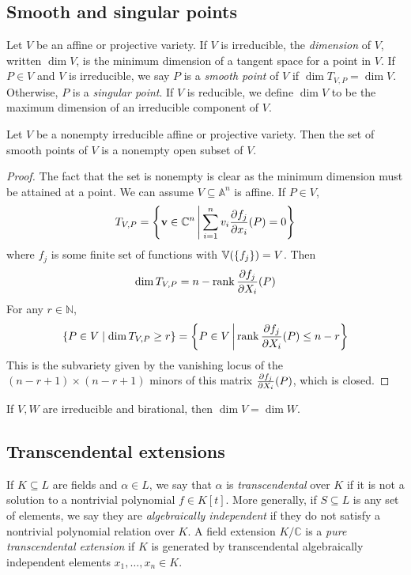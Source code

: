 \subsection{Smooth and singular points}
\begin{definition}
    Let \( V \) be an affine or projective variety.
    If \( V \) is irreducible, the \emph{dimension} of \( V \), written \( \dim V \), is the minimum dimension of a tangent space for a point in \( V \).
    If \( P \in V \) and \( V \) is irreducible, we say \( P \) is a \emph{smooth point} of \( V \) if \( \dim T_{V,P} = \dim V \).
    Otherwise, \( P \) is a \emph{singular point}.
    If \( V \) is reducible, we define \( \dim V \) to be the maximum dimension of an irreducible component of \( V \).
\end{definition}
\begin{theorem}
    Let \( V \) be a nonempty irreducible affine or projective variety.
    Then the set of smooth points of \( V \) is a nonempty open subset of \( V \).
\end{theorem}
\begin{proof}
    The fact that the set is nonempty is clear as the minimum dimension must be attained at a point.
    We can assume \( V \subseteq \mathbb A^n \) is affine.
    If \( P \in V \),
    \[ T_{V,P} = \qty{\vb v \in \mathbb C^n \,\middle|\,\sum_{i=1}^n v_i \pdv{f_j}{x_i}\qty(P) = 0} \]
    where \( f_j \) is some finite set of functions with \( \mathbb V(\qty{f_j}) = V \).
    Then
    \[ \dim T_{V,P} = n - \rank \pdv{f_j}{X_i}\qty(P) \]
    For any \( r \in \mathbb N \),
    \[ \qty{P \in V \mid \dim T_{V,P} \geq r} = \qty{P \in V \,\middle|\,\rank \pdv{f_j}{X_i}\qty(P) \leq n - r} \]
    This is the subvariety given by the vanishing locus of the \( (n-r+1) \times (n-r+1) \) minors of this matrix \( \pdv{f_j}{X_i}\qty(P) \), which is closed.
\end{proof}
\begin{corollary}
    If \( V, W \) are irreducible and birational, then \( \dim V = \dim W \).
\end{corollary}

\subsection{Transcendental extensions}
If \( K \subseteq L \) are fields and \( \alpha \in L \), we say that \( \alpha \) is \emph{transcendental} over \( K \) if it is not a solution to a nontrivial polynomial \( f \in K[t] \).
More generally, if \( S \subseteq L \) is any set of elements, we say they are \emph{algebraically independent} if they do not satisfy a nontrivial polynomial relation over \( K \).
A field extension \( K / \mathbb C \) is a \emph{pure transcendental extension} if \( K \) is generated by transcendental algebraically independent elements \( x_1, \dots, x_n \in K \).

